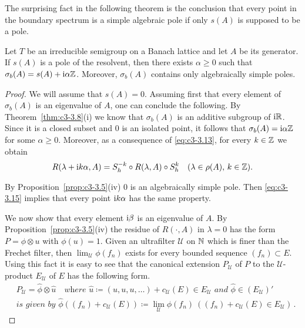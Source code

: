 The surprising fact in the following theorem is the conclusion that every point in the boundary spectrum is a simple algebraic pole if only $s(A)$ is supposed to be a pole.

\begin{theorem}\label{thm:c3-3.12}

Let $T$ be an irreducible semigroup on a Banach lattice and let $A$ be its generator.
If $s(A)$ is a pole of the resolvent, then there exists $\alpha \geq 0$ such that $\sigma_{b}(A) = s(A) + \mathrm{i}\alpha\mathbb{Z}$.
Moreover, $\sigma_{b}(A)$ contains only algebraically simple poles.
\end{theorem}

\begin{proof}
	We will assume that $s(A) = 0$.
	Assuming first that every element of $\sigma_{b}(A)$ is an eigenvalue of $A$, one can conclude the following.
	By Theorem~\ref{thm:c3-3.8}(i) we know that $\sigma_{b}(A)$ is an additive subgroup of $\mathrm{i}\mathbb{R} $.
	Since it is a closed subset and $0$ is an isolated point, it follows that $\sigma_{b}(A) = \mathrm{i}\alpha\mathbb{Z}$ for some $\alpha \geq 0$.
	Moreover, as a consequence of \eqref{eq:c3-3.13}, for every $k \in \mathbb{Z}$ we obtain
	\begin{equation}\label{eq:c3-3.15}
		R(\lambda+\mathrm{i} k\alpha,A) = S_{h}^{-k}\circ R(\lambda,A)\circ S_{h}^{k} \quad (\lambda \in \rho(A),\, k \in \mathbb{Z}).
	\end{equation}
	
	By Proposition~\ref{prop:c3-3.5}(iv) $0$ is an algebraically simple pole.
	Then \eqref{eq:c3-3.15} implies that every point $\mathrm{i} k\alpha$ has the same property.
	
	We now show that every element $\mathrm{i}\beta$ is an eigenvalue of $A$.
	By Proposition~\ref{prop:c3-3.5}(iv) the residue of $R(\cdot,A)$ in $\lambda = 0$ has the form $P = \phi\otimes u$ with $\phi(u) = 1$.
	Given an ultrafilter $\mathcal{U}$ on $\mathbb{N}$ which is finer than the Frechet filter, then $\lim_{\mathcal{U}}\phi(f_{n})$ exists for every bounded sequence $(f_{n}) \subset E$.
	Using this fact it is easy to see that the canonical extension $P_{\mathcal{U}}$ of $P$ to the $\mathcal{U}$-product $E_{\mathcal{U}}$ of $E$ has the following form.
	\begin{equation}\label{eq:c3-3.16}
		\begin{aligned}
		&P_{\mathcal{U}} = \hat{\phi}\otimes\hat{u} \quad \textit{where } \hat{u} \coloneqq (u,u,u,\ldots)+c_{\mathcal{U}}(E) \in E_{\mathcal{U}} \textit{ and } \hat{\phi} \in (E_{\mathcal{U}})'
		\\
		&\textit{is given by } \hat{\phi}((f_{n})+c_{\mathcal{U}}(E)) \coloneqq \lim_{\mathcal{U}}\phi(f_{n}) \ ((f_{n})+c_{\mathcal{U}}(E) \in E_{\mathcal{U}})\,.
		\end{aligned}
	\end{equation}
	

\end{proof}
